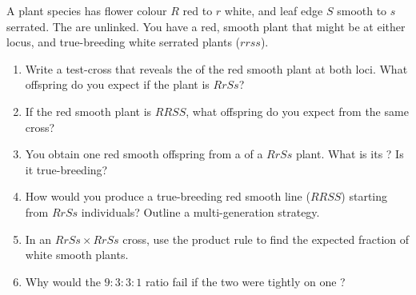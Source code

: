 \begin{problem}\label{pb:g11:mendelian-genetics:1}
A plant species has flower colour $R$ red  to $r$ white, and leaf edge
$S$ smooth  to $s$ serrated. The  are unlinked. You have a red,
smooth plant that might be  at either locus, and true-breeding white
serrated plants ($rrss$).
\begin{enumerate}
  \item Write a test-cross that reveals the  of the red smooth plant at
        both loci. What offspring  do you expect if the plant is
        $RrSs$?
  \item If the red smooth plant is $RRSS$, what offspring do you expect from the
        same cross?
  \item You obtain one red smooth offspring from a  of a $RrSs$ plant.
        What is its ? Is it true-breeding?
  \item How would you produce a true-breeding red smooth line ($RRSS$) starting
        from $RrSs$ individuals? Outline a multi-generation strategy.
  \item In an $RrSs \times RrSs$ cross, use the product rule to find the
        expected fraction of white smooth plants.
  \item Why would the $9:3:3:1$ ratio fail if the two  were tightly 
        on one ?
\end{enumerate}
\end{problem}
